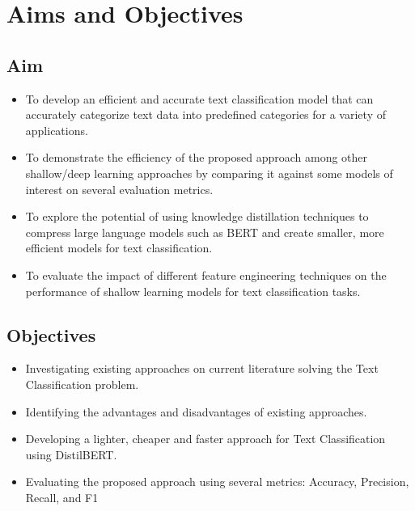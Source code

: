 \section{Aims and Objectives}
\subsection{Aim}
\begin{itemize}
\item To develop an efficient and accurate text classification model that can accurately categorize text data into predefined categories for a variety of applications.
\item To demonstrate the efficiency of the proposed approach among other shallow/deep learning approaches by comparing it against some models of interest on several evaluation metrics.
\item To explore the potential of using knowledge distillation techniques to compress large language models such as BERT and create smaller, more efficient models for text classification.
\item To evaluate the impact of different feature engineering techniques on the performance of shallow learning models for text classification tasks.
\end{itemize}

\subsection{Objectives}
\begin{itemize}
\item Investigating existing approaches on current literature solving the Text Classification problem.
\item Identifying the advantages and disadvantages of existing approaches.
\item Developing a lighter, cheaper and faster approach for Text Classification using DistilBERT.
\item Evaluating the proposed approach using several metrics: Accuracy, Precision, Recall, and F1
\end{itemize}